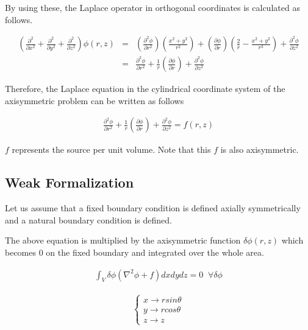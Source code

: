 By using these, the Laplace operator in orthogonal coordinates is calculated as follows.

\begin{eqnarray}
\left(\frac{\partial^2}{\partial x^2} + \frac{\partial^2}{\partial y^2}+\frac{\partial^2}{\partial z^2}\right)\phi(r,z)
&=&  \left(\frac{\partial^2\phi}{\partial r^2}\right)\left(\frac{x^2+y^2}{r^2}\right) + \left(\frac{\partial\phi}{\partial r}\right)\left(\frac{2}{r} - \frac{x^2+y^2}{r^3}\right) + \frac{\partial^2 \phi}{\partial z^2}\\
&=& \frac{\partial^2\phi}{\partial r^2} + \frac{1}{r}\left(\frac{\partial\phi}{\partial r}\right) + \frac{\partial^2 \phi}{\partial z^2}
\end{eqnarray}


Therefore, the Laplace equation in the cylindrical coordinate system of the axisymmetric problem can be written as follows


\begin{tcolorbox}[title=Laplace's Equation in Cylindrical Coordinate]
\begin{eqnarray}
\frac{\partial^2\phi}{\partial r^2} + \frac{1}{r}\left(\frac{\partial\phi}{\partial r}\right) + \frac{\partial^2 \phi}{\partial z^2} = f(r,z)
\end{eqnarray}
\end{tcolorbox}


$f$ represents the source per unit volume. Note that this $f$ is also axisymmetric.

\subsection{Weak Formalization}

Let us assume that a fixed boundary condition is defined axially symmetrically and a natural boundary condition is defined.


The above equation is multiplied by the axisymmetric function $\delta\phi(r,z)$ which becomes 0 on the fixed boundary and integrated over the whole area.

\begin{eqnarray}
\int_V\delta\phi (\nabla^2\phi+f) dxdydz = 0\;\; \forall \delta\phi
\end{eqnarray}


\begin{eqnarray}
\left\{\begin{array}{l}
x\rightarrow rsin\theta\\ y\rightarrow rcos\theta\\ z\rightarrow z
\end{array}\right.
\end{eqnarray}



